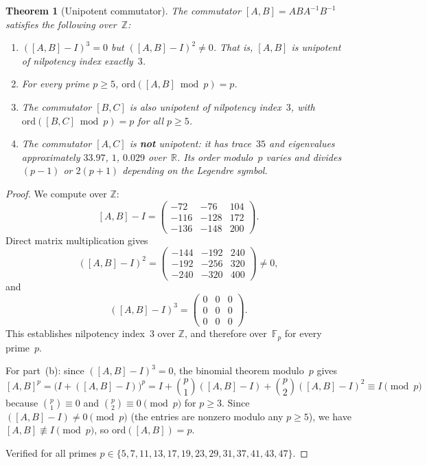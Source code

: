 \documentclass[12pt]{amsart}
\newtheorem{theorem}{Theorem}[section]
\theoremstyle{definition}
\theoremstyle{remark}
\begin{document}
\begin{theorem}[Unipotent commutator]\label{thm:unipotent}
The commutator $[A,B]=ABA^{-1}B^{-1}$ satisfies the following over~$\mathbb{Z}$:
\begin{enumerate}[label=(\alph*)]
  \item $([A,B]-I)^{3}=0$ but $([A,B]-I)^{2}\neq0$.  That is, $[A,B]$ is
    unipotent of nilpotency index exactly~$3$.
  \item For every prime $p\ge5$, $\mathrm{ord}([A,B]\bmod p)=p$.
  \item The commutator $[B,C]$ is also unipotent of nilpotency index~$3$, with
    $\mathrm{ord}([B,C]\bmod p)=p$ for all $p\ge5$.
  \item The commutator $[A,C]$ is \textbf{not} unipotent: it has trace~$35$ and
    eigenvalues approximately $33.97$, $1$, $0.029$ over~$\mathbb{R}$.  Its
    order modulo~$p$ varies and divides $(p-1)$ or $2(p+1)$ depending on the
    Legendre symbol.
\end{enumerate}
\end{theorem}

\begin{proof}
We compute over $\mathbb{Z}$:
\[
  [A,B] - I =
  \begin{pmatrix} -72 & -76 & 104 \\ -116 & -128 & 172 \\ -136 & -148 & 200 \end{pmatrix}.
\]
Direct matrix multiplication gives
\[
  ([A,B]-I)^{2} =
  \begin{pmatrix} -144 & -192 & 240 \\ -192 & -256 & 320 \\ -240 & -320 & 400 \end{pmatrix}
  \neq 0,
\]
and
\[
  ([A,B]-I)^{3} =
  \begin{pmatrix} 0 & 0 & 0 \\ 0 & 0 & 0 \\ 0 & 0 & 0 \end{pmatrix}.
\]
This establishes nilpotency index~$3$ over $\mathbb{Z}$, and therefore
over~$\mathbb{F}_{p}$ for every prime~$p$.

For part~(b): since $([A,B]-I)^{3}=0$, the binomial theorem modulo~$p$ gives
\[
  [A,B]^{p} = \bigl(I + ([A,B]-I)\bigr)^{p}
  = I + \binom{p}{1}([A,B]-I) + \binom{p}{2}([A,B]-I)^{2}
  \equiv I \pmod{p}
\]
because $\binom{p}{1}\equiv0$ and $\binom{p}{2}\equiv0\pmod{p}$ for $p\ge3$.
Since $([A,B]-I)\neq0\pmod{p}$ (the entries are nonzero modulo any $p\ge5$),
we have $[A,B]\not\equiv I\pmod{p}$, so $\mathrm{ord}([A,B])=p$.

Verified for all primes $p\in\{5,7,11,13,17,19,23,29,31,37,41,43,47\}$.
\end{proof}
\end{document}
